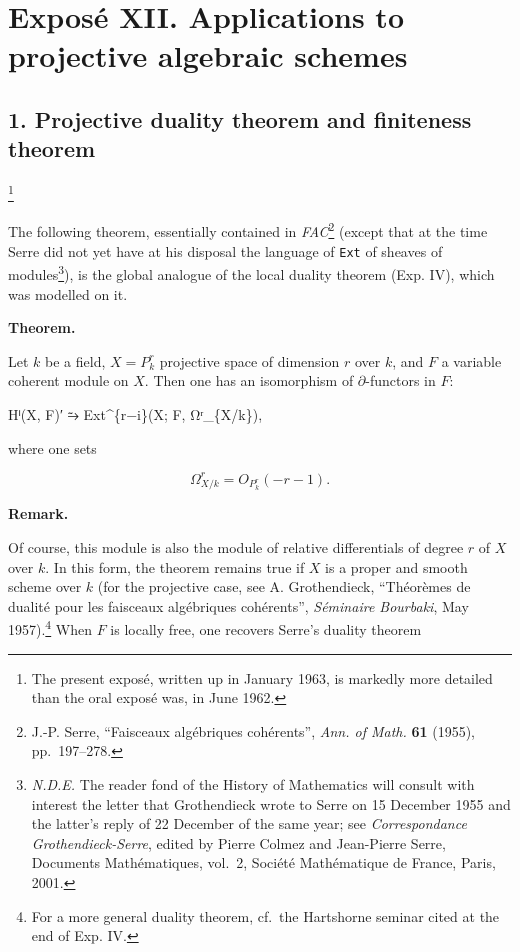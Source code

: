 \documentclass[
]{article}
\newenvironment{Shaded}{}{}
\newcommand{\NormalTok}[1]{#1}
\begin{document}
\section{Exposé XII. Applications to projective algebraic
schemes}\label{exposuxe9-xii.-applications-to-projective-algebraic-schemes}

\subsection{1. Projective duality theorem and finiteness
theorem}\label{projective-duality-theorem-and-finiteness-theorem}

\footnote{The present exposé, written up in January 1963, is markedly
  more detailed than the oral exposé was, in June 1962.}

The following theorem, essentially contained in \emph{FAC}\footnote{J.-P.
  Serre, ``Faisceaux algébriques cohérents'', \emph{Ann. of Math.}
  \textbf{61} (1955), pp.~197--278.} (except that at the time Serre did
not yet have at his disposal the language of \texttt{Ext} of sheaves of
modules\footnote{\emph{N.D.E.} The reader fond of the History of
  Mathematics will consult with interest the letter that Grothendieck
  wrote to Serre on 15 December 1955 and the latter's reply of 22
  December of the same year; see \emph{Correspondance
  Grothendieck-Serre}, edited by Pierre Colmez and Jean-Pierre Serre,
  Documents Mathématiques, vol.~2, Société Mathématique de France,
  Paris, 2001.}), is the global analogue of the local duality theorem
(Exp. IV), which was modelled on it.

\textbf{Theorem.}

Let \(k\) be a field, \(X = P^{r}_{k}\) projective space of dimension
\(r\) over \(k\), and \(F\) a variable coherent module on \(X\). Then
one has an isomorphism of \(\partial\)-functors in \(F\):

\begin{Shaded}
\begin{Highlighting}[]
\NormalTok{Hⁱ(X, F)′ ⥲ Ext\^{}\{r−i\}(X; F, Ωʳ\_\{X/k\}),}
\end{Highlighting}
\end{Shaded}

where one sets

\[
\Omega^{r}_{X/k} = O_{P^{r}_{k}}(-r - 1).
\]

\textbf{Remark.}

Of course, this module is also the module of relative differentials of
degree \(r\) of \(X\) over \(k\). In this form, the theorem remains true
if \(X\) is a proper and smooth scheme over \(k\) (for the projective
case, see A. Grothendieck, ``Théorèmes de dualité pour les faisceaux
algébriques cohérents'', \emph{Séminaire Bourbaki}, May
1957).\footnote{For a more general duality theorem, cf.~the Hartshorne
  seminar cited at the end of Exp. IV.} When \(F\) is locally free, one
recovers Serre's duality theorem
\end{document}

